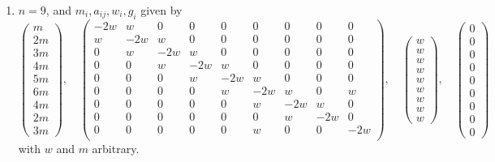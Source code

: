 \begin{lemma}
\begin{enumerate}
$$\right)
$$
with $w$ and $m$ arbitrary,
\item
\label{models-item-E8-completed}
$n = 9$, and $m_i, a_{ij}, w_i, g_i$ given by
$$
\left(
\begin{matrix}
m \\
2m \\
3m \\
4m \\
5m \\
6m \\
4m \\
2m \\
3m
\end{matrix}
\right),
\quad
\left(
\begin{matrix}
-2w & w & 0 & 0 & 0 & 0 & 0 & 0 & 0 \\
w & -2w & w & 0 & 0 & 0 & 0 & 0 & 0 \\
0 & w & -2w & w & 0 & 0 & 0 & 0 & 0 \\
0 & 0 & w & -2w & w & 0 & 0 & 0 & 0 \\
0 & 0 & 0 & w & -2w & w & 0 & 0 & 0 \\
0 & 0 & 0 & 0 & w & -2w & w & 0 & w \\
0 & 0 & 0 & 0 & 0 & w & -2w & w & 0 \\
0 & 0 & 0 & 0 & 0 & 0 & w & -2w & 0 \\
0 & 0 & 0 & 0 & 0 & w & 0 & 0 & -2w \\
\end{matrix}
\right),
\quad
\left(
\begin{matrix}
w \\
w \\
w \\
w \\
w \\
w \\
w \\
w \\
w
\end{matrix}
\right),
\quad
\left(
\begin{matrix}
0 \\
0 \\
0 \\
0 \\
0 \\
0 \\
0 \\
0 \\
0
\end{matrix}
\right)
$$
with $w$ and $m$ arbitrary.
\end{enumerate}
\end{lemma}

